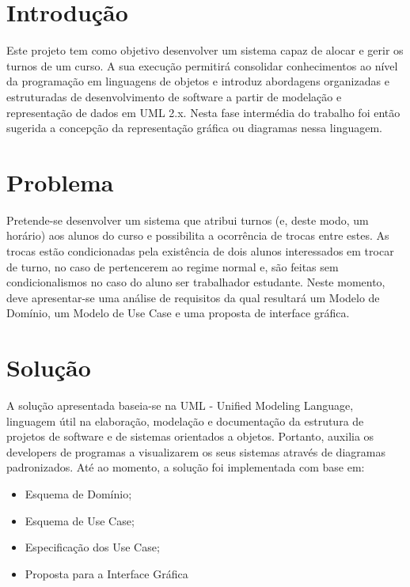 \documentclass[a4paper]{article}
\begin{document}
\pagebreak
\tableofcontents

\pagebreak
\section{Introdução}
\label{sec:1}

Este projeto tem como objetivo desenvolver um sistema capaz de alocar e gerir os turnos de um curso. A sua execução permitirá consolidar conhecimentos ao nível da programação em linguagens de objetos e introduz abordagens organizadas e estruturadas de desenvolvimento de software a partir de modelação e representação de dados em UML 2.x. 
Nesta fase intermédia do trabalho foi então sugerida a concepção da representação gráfica ou diagramas nessa linguagem.

\section{Problema}
\label{sec:2}

\hspace{3mm}

Pretende-se desenvolver um sistema que atribui turnos (e, deste modo, um horário) aos alunos do curso e possibilita a ocorrência de trocas entre estes. As trocas estão condicionadas pela existência de dois alunos interessados em trocar de turno, no caso de pertencerem ao regime normal e, são feitas sem condicionalismos no caso do aluno ser trabalhador estudante.
Neste momento, deve apresentar-se uma análise de requisitos da qual resultará um Modelo de Domínio, um Modelo de Use Case e uma proposta de interface gráfica.

\section{Solução}
\label{sec:3}


A solução apresentada baseia-se na UML - Unified Modeling Language, linguagem útil na elaboração, modelação e documentação da estrutura de projetos de software e de sistemas orientados a objetos. Portanto, auxilia os developers de programas a visualizarem os seus sistemas através de diagramas padronizados.
Até ao momento, a solução foi implementada com base em:

\begin{itemize}
    \item Esquema de Domínio;
    \item Esquema de Use Case;
    \item Especificação dos Use Case;
    \item Proposta para a Interface Gráfica
\end{itemize}
\end{document}
